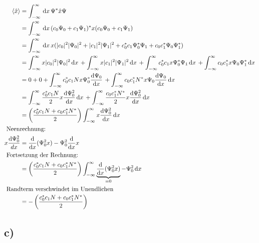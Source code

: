 \begin{align}
    \langle \hat x \rangle &= \int_{-\infty}^{\infty} \,\mathrm{d}x\, \Psi^* \hat x \Psi \\
    &=\int_{-\infty}^{\infty} \,\mathrm{d}x\, (c_0 \Psi _0 + c_1 \Psi _1)^*x(c_0 \Psi _0+c_1 \Psi _1)\\
    &=\int_{-\infty}^{\infty} \,\mathrm{d}x\, x (\lvert c_0\rvert^2\lvert\Psi _0\rvert^2+\lvert c_1\rvert^2 \lvert\Psi _1\rvert^2 + c_0^* c_1 \Psi_0^*\Psi _1+c_0 c_1^* \Psi _0 \Psi _1^*)\\
    &=\int_{-\infty}^{\infty} x \lvert c_0\rvert^2 \lvert\Psi _0\rvert^2 \,\mathrm{d}x\, +\int_{-\infty}^{\infty}  
    x \lvert c_1\rvert^2 \lvert\Psi _1\rvert^2 \,\mathrm{d}x\, +\int_{-\infty}^{\infty} c_0^* c_1 x \Psi_0^*\Psi_1 \,\mathrm{d}x\,
    + \int_{-\infty}^{\infty}  c_0 c_1^*x \Psi _0 \Psi_1^* \,\mathrm{d}x\,\\
    &= 0+0+\int_{-\infty}^{\infty} c_0^*c_1 N x \Psi _0^* \frac{\mathrm{d}\Psi _0}{\mathrm{d}x} \,+\int_{-\infty}^{\infty}  c_0 c_1^* N^* x \Psi _0 \frac{\mathrm{d}\Psi _0}{\mathrm{d}x} \,\mathrm{d}x\, \\
    &= \int_{-\infty}^{\infty} \frac{c_0^*c_1N}{2}x \frac{\mathrm{d} \Psi _0^2}{\mathrm{d}x}  \,\mathrm{d}x\, +\int_{-\infty}^{\infty} \frac{c_0 c_1^* N^*}{2}x \frac{\mathrm{d}\Psi _0^2 }{\mathrm{d}x} \,\mathrm{d}x\,\\
    &=\left(\frac{c_0^* c_1 N+c_0c_1^*N^*}{2}\right)\int_{-\infty}^{\infty} x \frac{\mathrm{d}\Psi _0^2 }{\mathrm{d}x} \,\mathrm{d}x\, \\
    \intertext {
        Neenrechnung:
    }    
    x\frac{\mathrm{d}\Psi _0^2}{dx} &= \frac{\mathrm{d}}{\mathrm{d}x}(\Psi _0^2 x)-\Psi_0^2 \frac{\mathrm{d}}{\mathrm{d}x}x\\
    \intertext{
        Fortsetzung der Rechnung:
    }
    &= \left(\frac{c_0^* c_1 N+c_0c_1^*N^*}{2}\right) \int_{-\infty}^{\infty} \underbrace{\frac{\mathrm{d}}{\mathrm{d}x}(\Psi _0^2 x)}_{=0} -\Psi_0^2 \,\mathrm{d}x\, \\
    \intertext{
        Randterm verschwindet im Unendlichen
    }
    &= -\left(\frac{c_0^* c_1 N+c_0c_1^*N^*}{2}\right)
\end{align}


\subsection{c)}
 
